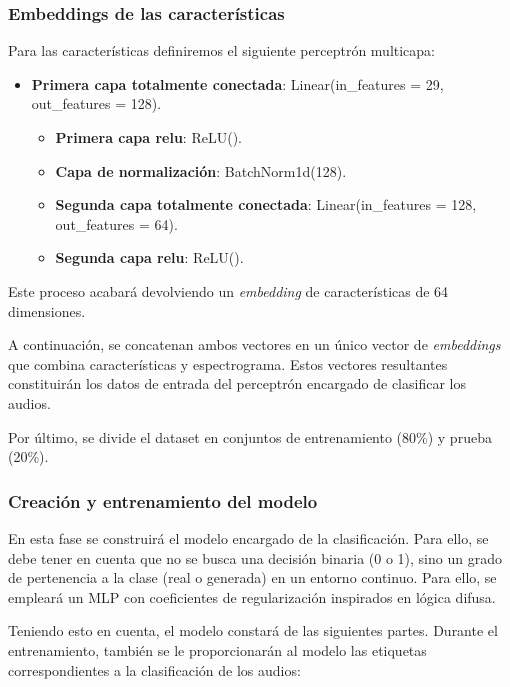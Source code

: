 \subsubsection*{Embeddings de las características}

Para las características definiremos el siguiente perceptrón multicapa:

\begin{itemize}
	\item \textbf{Primera capa totalmente conectada}: Linear(in\_features = 29, out\_features = 128). 
	  \begin{itemize}
	 	\item \textbf{Primera capa relu}: ReLU().
	 	\item \textbf{Capa de normalización}: BatchNorm1d(128).
	 	\item \textbf{Segunda capa totalmente conectada}: Linear(in\_features = 128, out\_features = 64).
	 	\item \textbf{Segunda capa relu}: ReLU().
	   \end{itemize}
\end{itemize}

Este proceso acabará devolviendo un \textit{embedding} de características de 64 dimensiones.

A continuación, se concatenan ambos vectores en un único vector de \textit{embeddings} que combina características y espectrograma. Estos vectores resultantes constituirán los datos de entrada del perceptrón encargado de clasificar los audios.

Por último, se divide el dataset en conjuntos de entrenamiento (80\%) y prueba (20\%).

\subsubsection*{Creación y entrenamiento del modelo}

En esta fase se construirá el modelo encargado de la clasificación. Para ello, se debe tener en cuenta que no se busca una decisión binaria (0 o 1), sino un grado de pertenencia a la clase (real o generada) en un entorno continuo. Para ello, se empleará un MLP con coeficientes de regularización inspirados en lógica difusa.

Teniendo esto en cuenta, el modelo constará de las siguientes partes. Durante el entrenamiento, también se le proporcionarán al modelo las etiquetas correspondientes a la clasificación de los audios:

